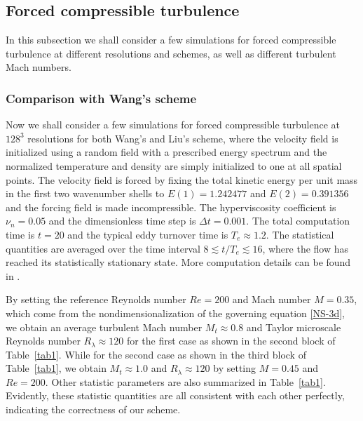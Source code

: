 \documentclass[review]{elsarticle}
\newcommand{\er}{\eqref}
\begin{document}
\subsection{Forced compressible turbulence}\label{sec.4.2}

In this subsection we shall consider a few simulations for forced compressible turbulence at different resolutions and schemes, as well as different turbulent Mach numbers.

\subsubsection{Comparison with Wang's scheme}

Now we shall consider a few simulations for forced compressible turbulence at $128^3$ resolutions for both Wang's and Liu's scheme, where the velocity field is initialized using a random field with a prescribed energy spectrum and the normalized temperature and density are simply initialized to one at all spatial points. The velocity field is forced by fixing the total kinetic energy per unit mass in the first two wavenumber shells to $E(1) = 1.242477$ and $E(2) = 0.391356$ and the forcing field is made incompressible. The hyperviscosity coefficient is $\nu_n = 0.05$ and the dimensionless time step is $\Delta t = 0.001$. The total computation time is $t=20$ and the typical eddy turnover time is $T_e \approx 1.2$. The statistical quantities are averaged over the time interval $8 \lesssim t/T_e \lesssim 16$, where the flow has reached its statistically stationary state. More computation details can be found in \citet{Wang2010}.

By setting the reference Reynolds number $Re=200$ and Mach number $M=0.35$, which come from the nondimensionalization of the governing equation \er{NS-3d}, we obtain an average turbulent Mach number $M_t \approx 0.8$ and Taylor microscale Reynolds number $R_\lambda \approx 120$ for the first case as shown in the second block of Table~\ref{tab1}. While for the second case as shown in the third block of Table~\ref{tab1}, we obtain $M_t \approx 1.0$ and $R_\lambda \approx 120$ by setting $M=0.45$ and $Re=200$. Other statistic parameters are also summarized in Table~\ref{tab1}. Evidently, these statistic quantities are all consistent with each other perfectly, indicating the correctness of our scheme.
\end{document}
